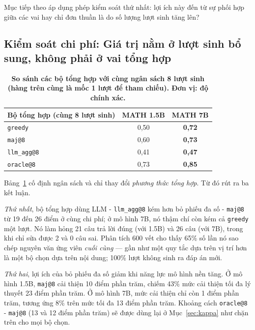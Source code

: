 \documentclass[12pt,a4paper]{article}
\begin{document}
Mục tiếp theo áp dụng phép kiểm soát thứ nhất: lợi ích này đến từ sự phối hợp giữa các vai hay chỉ đơn thuần là do số lượng lượt sinh tăng lên?

\subsection{Kiểm soát chi phí: Giá trị nằm ở lượt sinh bổ sung, không phải ở vai tổng hợp}\label{sec:budget}

\begin{table}[h]\centering\small
\begin{tabular}{@{}l c c@{}}
\toprule
Bộ tổng hợp (cùng 8 lượt sinh) & MATH 1.5B & MATH 7B\\
\midrule
\texttt{greedy} & 0,50 & \textbf{0,72}\\
\texttt{maj@8}     & 0,60 & \textbf{0,73}\\
\texttt{llm\_agg@8} & 0,41 & \textbf{0,47}\\
\texttt{oracle@8}      & 0,73 & \textbf{0,85}\\
\bottomrule
\end{tabular}
\caption{\textbf{So sánh các bộ tổng hợp với cùng ngân sách 8 lượt sinh (hàng trên cùng là mốc 1 lượt để tham chiếu). Đơn vị: độ chính xác.}}
\label{tab:budget}
\end{table}

Bảng~\ref{tab:budget} cố định ngân sách và chỉ thay đổi \textit{phương thức tổng hợp}. Từ đó rút ra ba kết luận.

\textit{Thứ nhất}, bộ tổng hợp dùng LLM - \texttt{llm\_agg@8} kém hơn bỏ phiếu đa số - \texttt{maj@8} từ 19 đến 26 điểm ở cùng chi phí; ở mô hình 7B, nó thậm chí còn kém cả \texttt{greedy} một lượt. Nó làm hỏng 21 câu trả lời đúng (với 1.5B) và 26 câu (với 7B), trong khi chỉ sửa được 2 và 0 câu sai. Phân tích 600 vết cho thấy 65\% số lần nó sao chép nguyên văn ứng viên \textit{cuối cùng} --- gần như một quy tắc dựa trên vị trí hơn là một bộ chọn dựa trên nội dung; 100\% lượt không sinh ra đáp án mới.

\textit{Thứ hai}, lợi ích của bỏ phiếu đa số giảm khi năng lực mô hình nền tăng. Ở mô hình 1.5B, \texttt{maj@8} cải thiện 10 điểm phần trăm, chiếm 43\% mức cải thiện tối đa lý thuyết 23 điểm phần trăm. Ở mô hình 7B, mức cải thiện chỉ còn 1 điểm phần trăm, tương ứng 8\% trên mức tối đa 13 điểm phần trăm. Khoảng cách \texttt{oracle@8} - \texttt{maj@8} (13 và 12 điểm phần trăm) sẽ được dùng lại ở Mục~\ref{sec:kappa} như chặn trên cho mọi bộ chọn.
\end{document}
